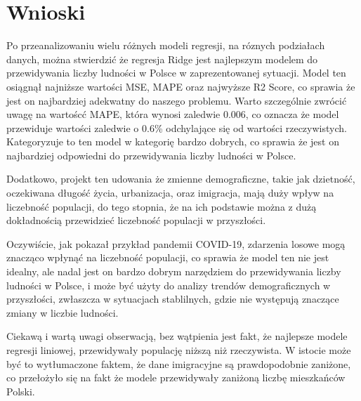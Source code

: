 \documentclass[11pt]{article}
\begin{document}
\section{Wnioski}
Po przeanalizowaniu wielu różnych modeli regresji, na róznych podziałach danych, można stwierdzić że regresja Ridge jest najlepszym modelem do przewidywania liczby ludności w Polsce w zaprezentowanej sytuacji.
Model ten osiągnął najniższe wartości MSE, MAPE oraz najwyższe R2 Score, co sprawia że jest on najbardziej adekwatny do naszego problemu.
Warto szczególnie zwrócić uwagę na wartoścć MAPE, która wynosi zaledwie 0.006, co oznacza że model przewiduje wartości zaledwie o 0.6\% odchylające się od wartości rzeczywistych.
Kategoryzuje to ten model w kategorię bardzo dobrych\cite{rg}, co sprawia że jest on najbardziej odpowiedni do przewidywania liczby ludności w Polsce.\par
Dodatkowo, projekt ten udowania że zmienne demograficzne, takie jak dzietność, oczekiwana długość życia, urbanizacja, oraz imigracja, mają duży wpływ na liczebność populacji,
do tego stopnia, że na ich podstawie można z dużą dokładnością przewidzieć liczebność populacji w przyszłości.\par
Oczywiście, jak pokazał przykład pandemii COVID-19, zdarzenia losowe mogą znacząco wpłynąć na liczebność populacji, co sprawia że model ten nie jest idealny, ale nadal jest on bardzo dobrym narzędziem do przewidywania liczby ludności w Polsce,
i może być użyty do analizy trendów demograficznych w przyszłości, zwłaszcza w sytuacjach stablilnych, gdzie nie występują znaczące zmiany w liczbie ludności.\par
Ciekawą i wartą uwagi obserwacją, bez wątpienia jest fakt, że najlepsze modele regresji liniowej, przewidywały populację niższą niż rzeczywista.
W istocie może być to wytłumaczone faktem, że dane imigracyjne są prawdopodobnie zaniżone, co przełożyło się na fakt że modele przewidywały zaniżoną liczbę mieszkańców Polski.
\end{document}
